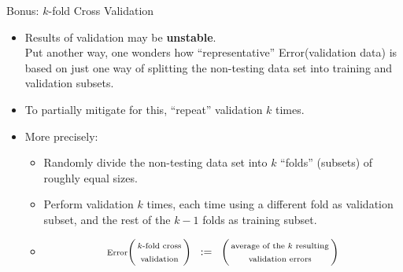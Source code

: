 


\begin{frame}{\Large Bonus: $k$-fold Cross Validation}

\small

\begin{itemize}

\item
	Results of validation may be \textbf{\color{red}unstable}.\\
	{\scriptsize Put another way, one wonders how ``representative'' Error(validation data) is
	based on just one way of splitting the non-testing data set into training and validation subsets.}

\vskip 0.3cm
\item
	To partially mitigate for this, ``repeat'' validation $k$ times.

\vskip 0.3cm
\item
	More precisely:
	\begin{itemize}
	\item
		Randomly divide the non-testing data set into $k$ ``folds'' (subsets) of roughly equal sizes.
	\item
		Perform validation $k$ times, each time using a different fold as validation subset,
		and the rest of the $k-1$ folds as training subset.
	\item
		\begin{equation*}
		\textnormal{\scriptsize Error}\!\left(\!\!\begin{array}{c}
			\textnormal{\scriptsize $k$-fold cross}
			\\
			\textnormal{\scriptsize validation}
			\end{array}\!\!\right)
		\;\; := \;\;
		\left(\!\!\begin{array}{c}
			\textnormal{\scriptsize average of the $k$ resulting}
			\\
			\textnormal{\scriptsize validation errors}
			\end{array}\!\!\right)
		\end{equation*}
	\end{itemize}
\end{itemize}

\end{frame}
\normalsize

